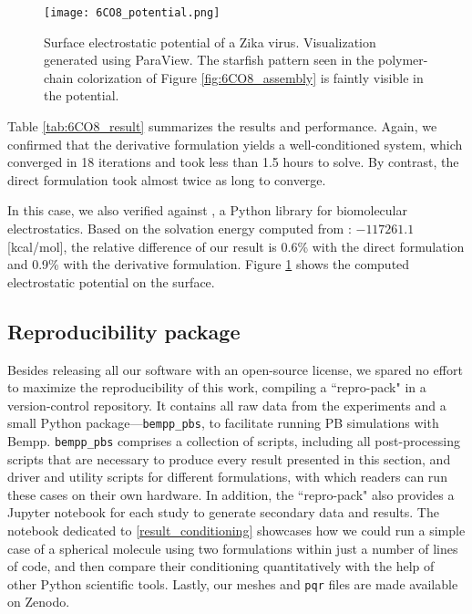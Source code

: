 \begin{figure*}[t]%
    \centering
    \texttt{[image: 6CO8\_potential.png]} 
    \caption{Surface electrostatic potential of a Zika virus. Visualization generated using ParaView. The starfish pattern seen in the polymer-chain colorization of Figure \ref{fig:6CO8_assembly} is faintly visible in the potential.}
    \label{fig:6CO8_potential}
\end{figure*}

Table \ref{tab:6CO8_result} summarizes the results and performance.
Again, we confirmed that the derivative formulation yields a well-conditioned system, which converged in 18 iterations and took less than 1.5 hours to solve.
By contrast, the direct formulation took almost twice as long to converge.

In this case, we also verified against \pygbe \cite{cooper2016pygbe}, a Python \bem library for biomolecular electrostatics.
Based on the solvation energy computed from \pygbe: $-117261.1$ [kcal/mol], the relative difference of our result is 0.6\% with the direct formulation and 0.9\% with the derivative formulation.
Figure \ref{fig:6CO8_potential} shows the computed electrostatic potential on the surface.

\subsection{Reproducibility package}

Besides releasing all our software with an open-source license, we spared no effort to maximize the reproducibility of this work, compiling a ``repro-pack" in a version-control repository.
It contains all raw data from the experiments and a small Python package---\texttt{bempp\_pbs}, to facilitate running PB simulations with Bempp.
\texttt{bempp\_pbs} comprises a collection of scripts, including all post-processing scripts that are necessary to produce every result presented in this section, and driver and utility scripts for different formulations, with which readers can run these cases on their own hardware.
In addition, the ``repro-pack" also provides a Jupyter notebook for each study to generate secondary data and results.
The notebook dedicated to \ref{result_conditioning} showcases how we could run a simple case of a spherical molecule using two formulations within just a number of lines of code, and then compare their conditioning quantitatively with the help of other Python scientific tools.
Lastly, our meshes and \texttt{pqr} files are made available on Zenodo.
